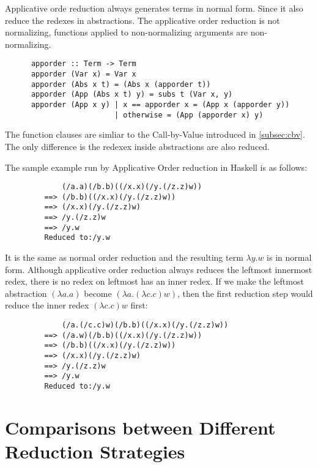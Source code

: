 Applicative orde reduction always generates terms in normal form. Since it also reduce the redexes in abstractions. The applicative order reduction is not normalizing, functions applied to non-normalizing arguments are non-normalizing.



\begin{verbatim}
      apporder :: Term -> Term
      apporder (Var x) = Var x
      apporder (Abs x t) = (Abs x (apporder t))
      apporder (App (Abs x t) y) = subs t (Var x, y)
      apporder (App x y) | x == apporder x = (App x (apporder y))
                         | otherwise = (App (apporder x) y)  
\end{verbatim}

The function clauses are simliar to the Call-by-Value introduced in \ref{subsec:cbv}. The only difference is the redexex inside abstractions are also reduced.


The sample example run by Applicative Order reduction in Haskell is as follows:

\begin{verbatim}
             (/a.a)(/b.b)((/x.x)(/y.(/z.z)w))
         ==> (/b.b)((/x.x)(/y.(/z.z)w))
         ==> (/x.x)(/y.(/z.z)w)
         ==> /y.(/z.z)w
         ==> /y.w
         Reduced to:/y.w
\end{verbatim}

It is the same as normal order reduction and the resulting term $\lambda y.w$ is in normal form. Although applicative order reduction always reduces the leftmost innermost redex, there is no redex on leftmost has an inner redex. If we make the leftmost abstraction $(\lambda a.a)$ become $(\lambda a.(\lambda c.c)w)$, then the first reduction step would reduce the inner redex $(\lambda c.c)w$ first:

\begin{verbatim}
             (/a.(/c.c)w)(/b.b)((/x.x)(/y.(/z.z)w))
         ==> (/a.w)(/b.b)((/x.x)(/y.(/z.z)w))
         ==> (/b.b)((/x.x)(/y.(/z.z)w))
         ==> (/x.x)(/y.(/z.z)w)
         ==> /y.(/z.z)w
         ==> /y.w
         Reduced to:/y.w
\end{verbatim}


\section{Comparisons between Different Reduction Strategies }
